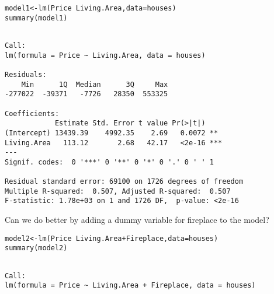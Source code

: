 \documentclass{beamer}\usepackage[]{graphicx}\usepackage[]{color}
\makeatletter
\newcommand{\hlopt}[1]{\textcolor[rgb]{1,0.894,0.769}{#1}}%
\newcommand{\hlstd}[1]{\textcolor[rgb]{1,0.894,0.769}{#1}}%
\newcommand{\hlkwb}[1]{\textcolor[rgb]{0.804,0.776,0.451}{#1}}%
\newcommand{\hlkwc}[1]{\textcolor[rgb]{0.78,0.941,0.545}{#1}}%
\newcommand{\hlkwd}[1]{\textcolor[rgb]{1,0.78,0.769}{#1}}%
\newenvironment{kframe}{%
 \def\at@end@of@kframe{}%
 \ifinner\ifhmode%
  \def\at@end@of@kframe{\end{minipage}}%
  \begin{minipage}{\columnwidth}%
 \fi\fi%
 \def\FrameCommand##1{\hskip\@totalleftmargin \hskip-\fboxsep
 \colorbox{shadecolor}{##1}\hskip-\fboxsep
     \hskip-\linewidth \hskip-\@totalleftmargin \hskip\columnwidth}%
 \MakeFramed {\advance\hsize-\width
   \@totalleftmargin\z@ \linewidth\hsize
   \@setminipage}}%
 {\par\unskip\endMakeFramed%
 \at@end@of@kframe}
\newenvironment{knitrout}{}{} %
\makeatother
\begin{document}
\begin{darkframes}
    \begin{frame}[fragile]
      \fontsize{8}{8}\selectfont
\begin{knitrout}
\begin{kframe}
\begin{alltt}
\hlstd{model1} \hlkwb{<-} \hlkwd{lm}\hlstd{(Price} \hlopt{~} \hlstd{Living.Area,} \hlkwc{data}\hlstd{=houses)}
\hlkwd{summary}\hlstd{(model1)}
\end{alltt}
\begin{verbatim}

Call:
lm(formula = Price ~ Living.Area, data = houses)

Residuals:
    Min      1Q  Median      3Q     Max 
-277022  -39371   -7726   28350  553325 

Coefficients:
            Estimate Std. Error t value Pr(>|t|)    
(Intercept) 13439.39    4992.35    2.69   0.0072 ** 
Living.Area   113.12       2.68   42.17   <2e-16 ***
---
Signif. codes:  0 '***' 0 '**' 0 '*' 0 '.' 0 ' ' 1

Residual standard error: 69100 on 1726 degrees of freedom
Multiple R-squared:  0.507,	Adjusted R-squared:  0.507 
F-statistic: 1.78e+03 on 1 and 1726 DF,  p-value: <2e-16
\end{verbatim}
\end{kframe}
\end{knitrout}
    \end{frame}

    \begin{frame}
      \begin{center}
        Can we do better by adding a dummy variable for fireplace to the model?
      \end{center}
    \end{frame}

    \begin{frame}[fragile]
      \fontsize{8}{8}\selectfont
\begin{knitrout}
\begin{kframe}
\begin{alltt}
\hlstd{model2} \hlkwb{<-} \hlkwd{lm}\hlstd{(Price} \hlopt{~} \hlstd{Living.Area} \hlopt{+} \hlstd{Fireplace,} \hlkwc{data}\hlstd{=houses)}
\hlkwd{summary}\hlstd{(model2)}
\end{alltt}
\begin{verbatim}

Call:
lm(formula = Price ~ Living.Area + Fireplace, data = houses)


\end{verbatim}
\end{kframe}
\end{knitrout}
\end{frame}
\end{darkframes}
\end{document}
